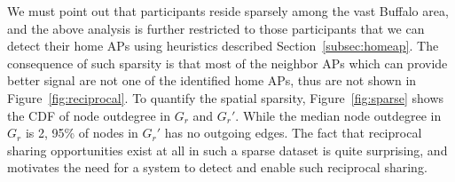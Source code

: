 We must point out that \PhoneLab{} participants reside sparsely among the vast
Buffalo area, and the above analysis is further restricted to those participants
that we can detect their home APs using heuristics described
Section~\ref{subsec:homeap}. The consequence of such sparsity is that most of
the neighbor APs which can provide better signal are not one of the identified
home APs, thus are not shown in Figure~\ref{fig:reciprocal}. To quantify the
spatial sparsity, Figure~\ref{fig:sparse} shows the CDF of node outdegree
in $G_r$ and $G_r'$. While the median node outdegree in $G_r$ is 2, 95\% of nodes
in $G_r'$ has no outgoing edges.  The fact that reciprocal sharing
opportunities exist at all in such a sparse dataset is quite surprising, and
motivates the need for a system to detect and enable such reciprocal \wifi{}
sharing.



